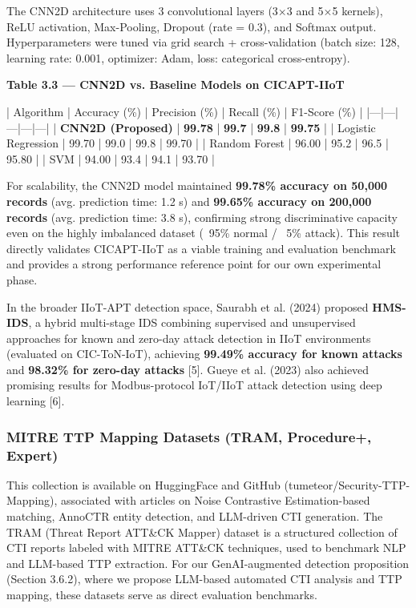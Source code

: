 The CNN2D architecture uses 3 convolutional layers (3×3 and 5×5 kernels), ReLU activation, Max-Pooling, Dropout (rate = 0.3), and Softmax output. Hyperparameters were tuned via grid search + cross-validation (batch size: 128, learning rate: 0.001, optimizer: Adam, loss: categorical cross-entropy).

\textbf{Table 3.3 — CNN2D vs. Baseline Models on CICAPT-IIoT \cite{ghiasvand2024cicapt}}

| Algorithm | Accuracy (\%) | Precision (\%) | Recall (\%) | F1-Score (\%) |
|---|---|---|---|---|
| \textbf{CNN2D (Proposed)} | \textbf{99.78} | \textbf{99.7} | \textbf{99.8} | \textbf{99.75} |
| Logistic Regression | 99.70 | 99.0 | 99.8 | 99.70 |
| Random Forest | 96.00 | 95.2 | 96.5 | 95.80 |
| SVM | 94.00 | 93.4 | 94.1 | 93.70 |

For scalability, the CNN2D model maintained \textbf{99.78\% accuracy on 50,000 records} (avg. prediction time: 1.2 s) and \textbf{99.65\% accuracy on 200,000 records} (avg. prediction time: 3.8 s), confirming strong discriminative capacity even on the highly imbalanced dataset (~95\% normal / ~5\% attack). This result directly validates CICAPT-IIoT \cite{ghiasvand2024cicapt} as a viable training and evaluation benchmark and provides a strong performance reference point for our own experimental phase.

In the broader IIoT-APT detection space, Saurabh et al. (2024) proposed \textbf{HMS-IDS}, a hybrid multi-stage IDS combining supervised and unsupervised approaches for known and zero-day attack detection in IIoT environments (evaluated on CIC-ToN-IoT), achieving \textbf{99.49\% accuracy for known attacks} and \textbf{98.32\% for zero-day attacks} [5]. Gueye et al. (2023) also achieved promising results for Modbus-protocol IoT/IIoT attack detection using deep learning [6].

\subsubsection{MITRE TTP Mapping Datasets (TRAM, Procedure+, Expert)}

This collection is available on HuggingFace and GitHub (tumeteor/Security-TTP-Mapping), associated with articles on Noise Contrastive Estimation-based matching, AnnoCTR entity detection, and LLM-driven CTI generation. The TRAM (Threat Report ATT\&CK Mapper) dataset is a structured collection of CTI reports labeled with MITRE ATT\&CK techniques, used to benchmark NLP and LLM-based TTP extraction. For our GenAI-augmented detection proposition (Section 3.6.2), where we propose LLM-based automated CTI analysis and TTP mapping, these datasets serve as direct evaluation benchmarks.

